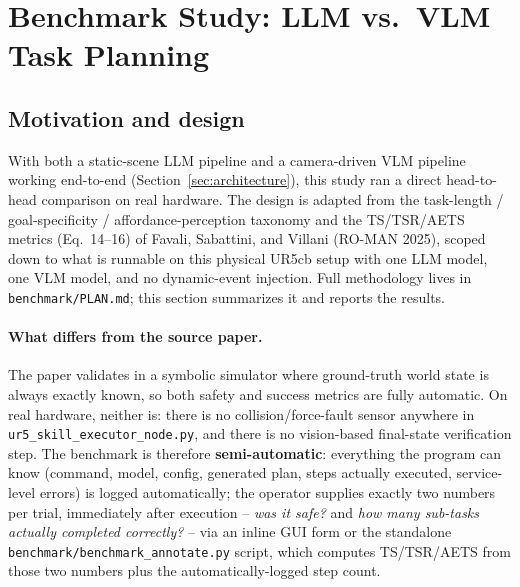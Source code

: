 \section{Benchmark Study: LLM vs.\ VLM Task Planning}
\label{sec:benchmark}

\subsection{Motivation and design}

With both a static-scene LLM pipeline and a camera-driven VLM pipeline
working end-to-end (Section~\ref{sec:architecture}), this study ran a direct
head-to-head comparison on real hardware. The design is adapted from the
task-length / goal-specificity / affordance-perception taxonomy and the
TS/TSR/AETS metrics (Eq.\ 14--16) of Favali, Sabattini, and Villani
(RO-MAN 2025), scoped down to what is runnable on this physical UR5cb setup
with one LLM model, one VLM model, and no dynamic-event injection. Full
methodology lives in \texttt{benchmark/PLAN.md}; this section summarizes it
and reports the results.

\paragraph{What differs from the source paper.} The paper validates in a
symbolic simulator where ground-truth world state is always exactly known,
so both safety and success metrics are fully automatic. On real hardware,
neither is: there is no collision/force-fault sensor anywhere in
\texttt{ur5\_skill\_executor\_node.py}, and there is no vision-based
final-state verification step. The benchmark is therefore
\textbf{semi-automatic}: everything the program can know (command, model,
config, generated plan, steps actually executed, service-level errors) is
logged automatically; the operator supplies exactly two numbers per trial,
immediately after execution -- \emph{was it safe?} and \emph{how many
sub-tasks actually completed correctly?} -- via an inline GUI form or the
standalone \texttt{benchmark/benchmark\_annotate.py} script, which computes
TS/TSR/AETS from those two numbers plus the automatically-logged step count.

